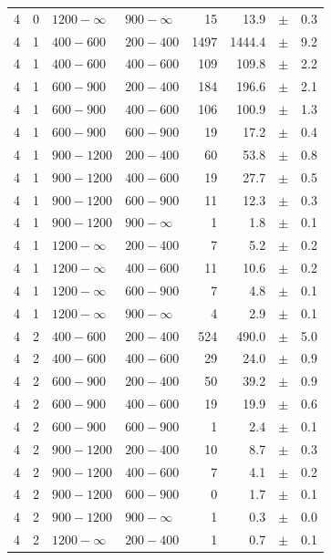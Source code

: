 \begin{table}[!h]
\begin{tabular}{rrllrrcl}
4 & 0 & $1200- \infty$ & $900-\infty$ &     15 &     13.9 &$\pm$&    0.3 \\
4 & 1 & $ 400- 600$ & $200-400$ &   1497 &   1444.4 &$\pm$&    9.2 \\
4 & 1 & $ 400- 600$ & $400-600$ &    109 &    109.8 &$\pm$&    2.2 \\
4 & 1 & $ 600- 900$ & $200-400$ &    184 &    196.6 &$\pm$&    2.1 \\
4 & 1 & $ 600- 900$ & $400-600$ &    106 &    100.9 &$\pm$&    1.3 \\
4 & 1 & $ 600- 900$ & $600-900$ &     19 &     17.2 &$\pm$&    0.4 \\
4 & 1 & $ 900-1200$ & $200-400$ &     60 &     53.8 &$\pm$&    0.8 \\
4 & 1 & $ 900-1200$ & $400-600$ &     19 &     27.7 &$\pm$&    0.5 \\
4 & 1 & $ 900-1200$ & $600-900$ &     11 &     12.3 &$\pm$&    0.3 \\
4 & 1 & $ 900-1200$ & $900-\infty$ &      1 &      1.8 &$\pm$&    0.1 \\
4 & 1 & $1200- \infty$ & $200-400$ &      7 &      5.2 &$\pm$&    0.2 \\
4 & 1 & $1200- \infty$ & $400-600$ &     11 &     10.6 &$\pm$&    0.2 \\
4 & 1 & $1200- \infty$ & $600-900$ &      7 &      4.8 &$\pm$&    0.1 \\
4 & 1 & $1200- \infty$ & $900-\infty$ &      4 &      2.9 &$\pm$&    0.1 \\
4 & 2 & $ 400- 600$ & $200-400$ &    524 &    490.0 &$\pm$&    5.0 \\
4 & 2 & $ 400- 600$ & $400-600$ &     29 &     24.0 &$\pm$&    0.9 \\
4 & 2 & $ 600- 900$ & $200-400$ &     50 &     39.2 &$\pm$&    0.9 \\
4 & 2 & $ 600- 900$ & $400-600$ &     19 &     19.9 &$\pm$&    0.6 \\
4 & 2 & $ 600- 900$ & $600-900$ &      1 &      2.4 &$\pm$&    0.1 \\
4 & 2 & $ 900-1200$ & $200-400$ &     10 &      8.7 &$\pm$&    0.3 \\
4 & 2 & $ 900-1200$ & $400-600$ &      7 &      4.1 &$\pm$&    0.2 \\
4 & 2 & $ 900-1200$ & $600-900$ &      0 &      1.7 &$\pm$&    0.1 \\
4 & 2 & $ 900-1200$ & $900-\infty$ &      1 &      0.3 &$\pm$&    0.0 \\
4 & 2 & $1200- \infty$ & $200-400$ &      1 &      0.7 &$\pm$&    0.1 \\

\end{tabular}
\end{table}
